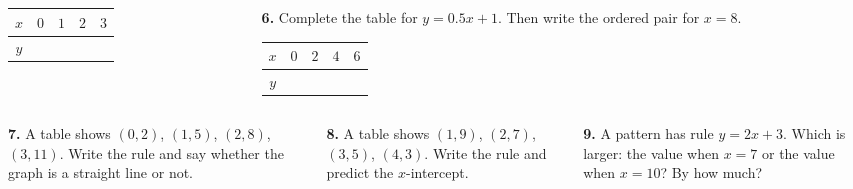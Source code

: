 \documentclass[aspectratio=169,12pt]{beamer}
\newcommand{\MMProblem}[2]{\begin{MMProblemCard}\raggedright\small\textbf{#1.} #2\par\end{MMProblemCard}}
\begin{document}
\begin{frame}[t]
\begin{columns}[T,onlytextwidth]
\begin{column}{0.32\textwidth}
{\begin{tabular}{|c|c|c|c|c|}
\hline
$x$ & $0$ & $1$ & $2$ & $3$ \\\hline
$y$ &  &  &  &  \\\hline
\end{tabular}}\end{column}
\begin{column}{0.32\textwidth}\MMProblem{6}{Complete the table for \mbox{$y=0.5x+1$}. Then write the ordered pair for \mbox{$x=8$}.\\[0.3em]
\begin{tabular}{|c|c|c|c|c|}
\hline
$x$ & $0$ & $2$ & $4$ & $6$ \\\hline
$y$ &  &  &  &  \\\hline
\end{tabular}}\end{column}
\end{columns}
\vspace{0.45em}
\begin{columns}[T,onlytextwidth]
\begin{column}{0.32\textwidth}\MMProblem{7}{A table shows \mbox{$(0,2)$}, \mbox{$(1,5)$}, \mbox{$(2,8)$}, \mbox{$(3,11)$}. Write the rule and say whether the graph is a straight line or not.}\end{column}
\begin{column}{0.32\textwidth}\MMProblem{8}{A table shows \mbox{$(1,9)$}, \mbox{$(2,7)$}, \mbox{$(3,5)$}, \mbox{$(4,3)$}. Write the rule and predict the \mbox{$x$}-intercept.}\end{column}
\begin{column}{0.32\textwidth}\MMProblem{9}{A pattern has rule \mbox{$y=2x+3$}. Which is larger: the value when \mbox{$x=7$} or the value when \mbox{$x=10$}? By how much?}\end{column}
\end{columns}
\end{frame}
\end{document}
